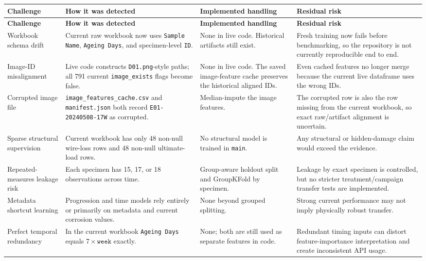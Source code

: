 \documentclass[11pt]{article}
\begin{document}
\begin{longtable}{p{} p{} p{} p{}}
\toprule
\textbf{Challenge} & \textbf{How it was detected} & \textbf{Implemented handling} & \textbf{Residual risk} \\
\midrule
\endfirsthead
\toprule
\textbf{Challenge} & \textbf{How it was detected} & \textbf{Implemented handling} & \textbf{Residual risk} \\
\midrule
\endhead
Workbook schema drift & Current raw workbook now uses \texttt{Sample Name}, \texttt{Ageing Days}, and specimen-level \texttt{ID}. & None in live code. Historical artifacts still exist. & Fresh training now fails before benchmarking, so the repository is not currently reproducible end to end. \\
Image-ID misalignment & Live code constructs \texttt{D01.png}-style paths; all 791 current \texttt{image\_exists} flags become false. & None in live code. The saved image-feature cache preserves the historical aligned IDs. & Even cached features no longer merge because the current live dataframe uses the wrong IDs. \\
Corrupted image file & \texttt{image\_features\_cache.csv} and \texttt{manifest.json} both record \texttt{E01-20240508-17W} as corrupted. & Median-impute the image features. & The corrupted row is also the row missing from the current workbook, so exact raw/artifact alignment is uncertain. \\
Sparse structural supervision & Current workbook has only 48 non-null wire-loss rows and 48 non-null ultimate-load rows. & No structural model is trained in \texttt{main}. & Any structural or hidden-damage claim would exceed the evidence. \\
Repeated-measures leakage risk & Each specimen has 15, 17, or 18 observations across time. & Group-aware holdout split and GroupKFold by specimen. & Leakage by exact specimen is controlled, but no stricter treatment/campaign transfer tests are implemented. \\
Metadata shortcut learning & Progression and time models rely entirely or primarily on metadata and current corrosion values. & None beyond grouped splitting. & Strong current performance may not imply physically robust transfer. \\
Perfect temporal redundancy & In the current workbook \texttt{Ageing Days} equals \(7 \times \texttt{week}\) exactly. & None; both are still used as separate features in code. & Redundant timing inputs can distort feature-importance interpretation and create inconsistent API usage. \\

\end{longtable}
\end{document}
